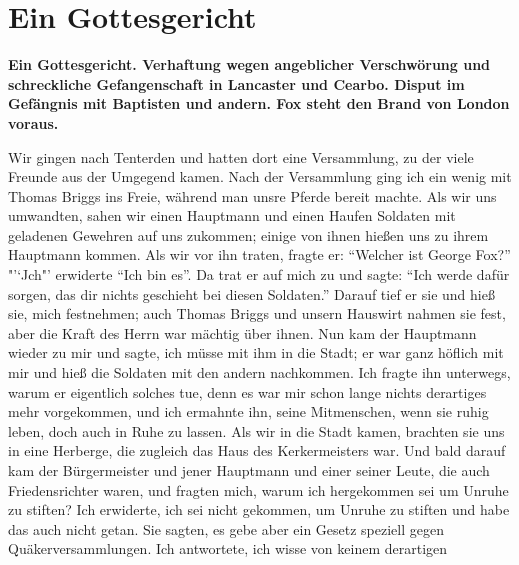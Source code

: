 \chapter[Ein Gottesgericht]{Ein Gottesgericht}

\begin{center}
\textbf{Ein Gottesgericht. Verhaftung wegen angeblicher Verschwörung
und schreckliche Gefangenschaft in Lancaster und Cearbo. Disput
im Gefängnis mit Baptisten und andern. Fox steht den Brand
von London voraus.}
\end{center}

Wir gingen nach Tenterden und hatten dort eine Versammlung, 
zu der viele Freunde aus der Umgegend kamen. Nach der
Versammlung ging ich ein wenig mit Thomas Briggs ins Freie,
während man unsre Pferde bereit machte. Als wir uns umwandten, 
sahen wir einen Hauptmann und einen Haufen Soldaten
mit geladenen Gewehren auf uns zukommen; einige von ihnen
hießen uns zu ihrem Hauptmann kommen. Als wir vor ihn
traten, fragte er: "`Welcher ist George Fox?"' "'`Jch"' erwiderte
"`Ich bin es"'. Da trat er auf mich zu und sagte: "`Ich werde
dafür sorgen, das dir nichts geschieht bei diesen Soldaten."' 
Darauf tief er sie und hieß sie, mich festnehmen; auch Thomas
Briggs und unsern Hauswirt nahmen sie fest, aber die Kraft des
Herrn war mächtig über ihnen. Nun kam der Hauptmann
wieder zu mir und sagte, ich müsse mit ihm in die Stadt;
er war ganz höflich mit mir und hieß die Soldaten mit den
andern nachkommen. Ich fragte ihn unterwegs, warum er
eigentlich solches tue, denn es war mir schon lange nichts 
derartiges mehr vorgekommen, und ich ermahnte ihn, seine Mitmenschen,
wenn sie ruhig leben, doch auch in Ruhe zu lassen. Als wir in
die Stadt kamen, brachten sie uns in eine Herberge, die zugleich
das Haus des Kerkermeisters war. Und bald darauf kam der
Bürgermeister und jener Hauptmann und einer seiner Leute, die
auch Friedensrichter waren, und fragten mich, warum ich 
hergekommen sei um Unruhe zu stiften? Ich erwiderte, ich sei nicht
gekommen, um Unruhe zu stiften und habe das auch nicht getan.
Sie sagten, es gebe aber ein Gesetz speziell gegen 
Quäkerversammlungen. Ich antwortete, ich wisse von keinem derartigen